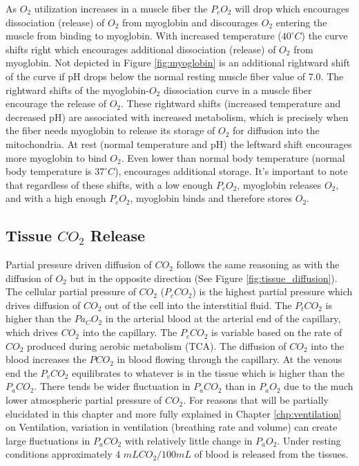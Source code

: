 As $O_2$ utilization increases in a muscle fiber the $P_cO_2$ will drop which encourages dissociation (release) of $O_2$ from myoglobin and discourages $O_2$ entering the muscle from binding to myoglobin. With increased temperature ($40^{\circ} C$) the curve shifts right which encourages additional dissociation (release) of $O_2$ from myoglobin. Not depicted in Figure \ref{fig:myoglobin} is an additional rightward shift of the curve if pH drops below the normal resting muscle fiber value of 7.0. The rightward shifts of the myoglobin-$O_2$ dissociation curve in a muscle fiber encourage the release of $O_2$. These rightward shifts (increased temperature and decreased pH) are associated with increased metabolism, which is precisely when the fiber needs myoglobin to release its storage of $O_2$ for diffusion into the mitochondria. At rest (normal temperature and pH) the leftward shift encourages more myoglobin to bind $O_2$. Even lower than normal body temperature (normal body temperature is $37^{\circ} C$), encourages additional storage. It's important to note that regardless of these shifts, with a low enough $P_cO_2$, myoglobin releases $O_2$, and with a high enough $P_cO_2$, myoglobin binds and therefore stores $O_2$.


\subsection{Tissue $CO_2$ Release}
Partial pressure driven diffusion of $CO_2$ follows the same reasoning as with the diffusion of $O_2$ but in the opposite direction (See Figure \ref{fig:tissue_diffusion}). The cellular partial pressure of $CO_2$ ($P_cCO_2$) is the highest partial pressure which drives diffusion of $CO_2$ out of the cell into the interstitial fluid. The $P_tCO_2$ is higher than the $Pa_CO_2$ in the arterial blood at the arterial end of the capillary, which drives $CO_2$ into the capillary. The $P_cCO_2$ is variable based on the rate of $CO_2$ produced during aerobic metabolism (TCA). The diffusion of $CO_2$ into the blood increases the $PCO_2$ in blood flowing through the capillary. At the venous end the $P_vCO_2$ equilibrates to whatever is in the tissue which is higher than the $P_aCO_2$. There tends be wider fluctuation in $P_aCO_2$ than in $P_aO_2$ due to the much lower atmospheric partial pressure of $CO_2$. For reasons that will be partially elucidated in this chapter and more fully explained in Chapter \ref{chp:ventilation} on Ventilation, variation in ventilation (breathing rate and volume) can create large fluctuations in $P_aCO_2$ with relatively little change in $P_aO_2$. Under resting conditions approximately 4 $mL CO_2 / 100 mL$ of blood is released from the tissues. 

